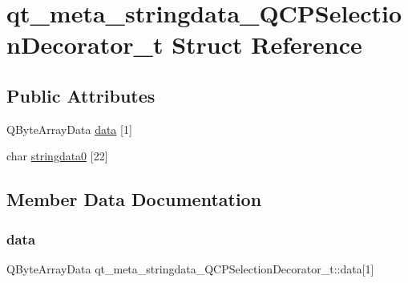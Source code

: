 \hypertarget{structqt__meta__stringdata__QCPSelectionDecorator__t}{}\section{qt\+\_\+meta\+\_\+stringdata\+\_\+\+Q\+C\+P\+Selection\+Decorator\+\_\+t Struct Reference}
\label{structqt__meta__stringdata__QCPSelectionDecorator__t}
\subsection*{Public Attributes}
\begin{DoxyCompactItemize}
\item 
Q\+Byte\+Array\+Data \mbox{\hyperlink{structqt__meta__stringdata__QCPSelectionDecorator__t_a1afefbcc9caf562bf85a48bef4fdd12a}{data}} \mbox{[}1\mbox{]}
\item 
char \mbox{\hyperlink{structqt__meta__stringdata__QCPSelectionDecorator__t_a396f24ff22a1439774cf0634b5080197}{stringdata0}} \mbox{[}22\mbox{]}
\end{DoxyCompactItemize}


\subsection{Member Data Documentation}
\mbox{\label{structqt__meta__stringdata__QCPSelectionDecorator__t_a1afefbcc9caf562bf85a48bef4fdd12a}} 
\subsubsection{\texorpdfstring{data}{data}}
{\footnotesize\ttfamily Q\+Byte\+Array\+Data qt\+\_\+meta\+\_\+stringdata\+\_\+\+Q\+C\+P\+Selection\+Decorator\+\_\+t\+::data\mbox{[}1\mbox{]}}

\mbox{\label{structqt__meta__stringdata__QCPSelectionDecorator__t_a396f24ff22a1439774cf0634b5080197}} 
